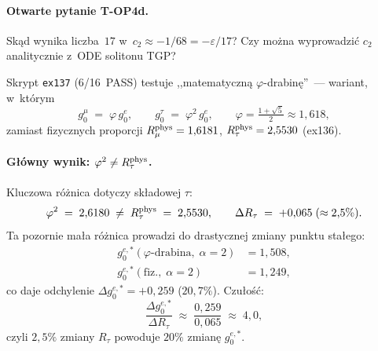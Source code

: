 \begin{observation}
  \paragraph{Otwarte pytanie T-OP4d.}
  Sk\k{a}d wynika liczba~$17$ w~$c_2 \approx -1/68 = -\varepsilon/17$?
  Czy mo\.zna wyprowadzi\'c $c_2$ analitycznie z~ODE solitonu TGP?
\end{observation}

\begin{observation}[Matematyczna $\varphi$-drabina daje
  $g_0^{e,*}(\alpha=2)=1{,}508 \neq 5/4$ (\texttt{ex137}, 6/16~PASS)]
  \label{obs:T2-ex137}
  Skrypt \texttt{ex137} (6/16~PASS) testuje ,,matematyczn\k{a}
  $\varphi$-drabin\k{e}''~--- wariant, w~kt\'orym
  \begin{equation}\label{eq:T2-phi-ladder}
    g_0^\mu \;=\; \varphi\,g_0^e, \qquad
    g_0^\tau \;=\; \varphi^2\,g_0^e,
    \qquad \varphi = \tfrac{1+\sqrt{5}}{2} \approx 1{,}618,
  \end{equation}
  zamiast fizycznych proporcji $R_\mu^{\rm phys}=1{,}6181$,
  $R_\tau^{\rm phys}=2{,}5530$ (ex136).

  \paragraph{G\l{}\'owny wynik: $\varphi^2 \neq R_\tau^{\rm phys}$.}
  Kluczowa r\'o\.znica dotyczy sk\l{}adowej $\tau$:
  \begin{equation}\label{eq:T2-phi2-vs-Rtau}
    \varphi^2 \;=\; 2{,}6180 \;\neq\; R_\tau^{\rm phys} \;=\; 2{,}5530,
    \qquad \Delta R_\tau \;=\; +0{,}065 \;(\approx 2{,}5\%).
  \end{equation}
  Ta pozornie ma\l{}a r\'o\.znica prowadzi do drastycznej zmiany
  punktu sta\l{}ego:
  \begin{align}\label{eq:T2-phi-vs-phys}
    g_0^{e,*}(\varphi\text{-drabina},\;\alpha=2) &= 1{,}508, \\
    g_0^{e,*}(\text{fiz.},\;\alpha=2)            &= 1{,}249,
  \end{align}
  co daje odchylenie $\Delta g_0^{e,*} = +0{,}259$ ($20{,}7\%$).
  Czu\l{}o\'s\'c:
  \begin{equation}\label{eq:T2-sensitivity}
    \frac{\Delta g_0^{e,*}}{\Delta R_\tau}
    \;\approx\; \frac{0{,}259}{0{,}065} \;\approx\; 4{,}0,
  \end{equation}
  czyli $2{,}5\%$ zmiany $R_\tau$ powoduje $20\%$ zmian\k{e}
  $g_0^{e,*}$.


\end{observation}
